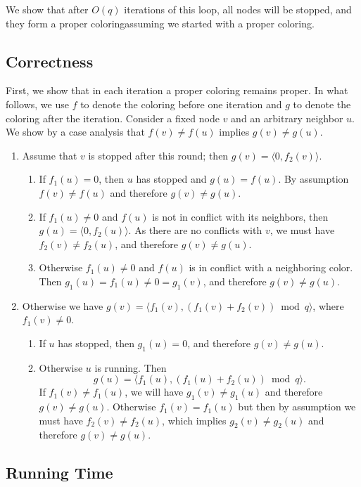 We show that after $O(q)$ iterations of this loop, all nodes will be stopped, and they form a proper coloring\mydash assuming we started with a proper coloring.

\subsection{Correctness}

First, we show that in each iteration a proper coloring remains proper. In what follows, we use $f$ to denote the coloring before one iteration and $g$ to denote the coloring after the iteration. Consider a fixed node $v$ and an arbitrary neighbor $u$. We show by a case analysis that $f(v) \neq f(u)$ implies $g(v) \neq g(u)$.
\begin{enumerate}[label=(\arabic*)]
  \item Assume that $v$ is stopped after this round; then $g(v) = \langle 0, f_2(v) \rangle$.
  \begin{enumerate}
    \item If $f_1(u) = 0$, then $u$ has stopped and $g(u) = f(u)$. By assumption $f(v) \neq f(u)$ and therefore $g(v) \neq g(u)$.
    \item If $f_1(u) \neq 0$ and $f(u)$ is not in conflict with its neighbors, then $g(u) = \langle 0, f_2(u) \rangle$. As there are no conflicts with $v$, we must have $f_2(v) \neq f_2(u)$, and therefore $g(v) \neq g(u)$.
    \item Otherwise $f_1(u) \neq 0$ and $f(u)$ is in conflict with a neighboring color. Then $g_1(u) = f_1(u) \neq 0 = g_1(v)$, and therefore $g(v) \neq g(u)$.
  \end{enumerate}
  \item Otherwise we have $g(v) = \langle f_1(v), (f_1(v) + f_2(v)) \bmod q \rangle$, where $f_1(v) \ne 0$.
  \begin{enumerate}
    \item If $u$ has stopped, then $g_1(u) = 0$, and therefore $g(v) \neq g(u)$.
    \item Otherwise $u$ is running. Then \[g(u) = \langle f_1(u), (f_1(u)+f_2(u)) \bmod q \rangle.\] If $f_1(v) \ne f_1(u)$, we will have $g_1(v) \ne g_1(u)$ and therefore $g(v) \ne g(u)$. Otherwise $f_1(v) = f_1(u)$ but then by assumption we must have $f_2(v) \ne f_2(u)$, which implies $g_2(v) \ne g_2(u)$ and therefore $g(v) \ne g(u)$.
  \end{enumerate}
\end{enumerate}

\subsection{Running Time}


